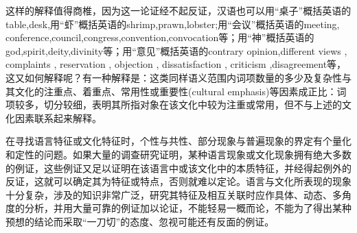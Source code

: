 这样的解释值得商椎，因为这一论证经不起反证，汉语也可以用“桌子”概括英语的table,desk,用“虾”概括英语的shrimp,prawn,lobster;用“会议”概括英语的meeting,
conference,council,congress,convention,convocation等；用“神”概括英语的god,spirit,deity,divinity等；用“意见”概括英语的contrary opinion,different views , complaints , reservation , objection , dissatisfaction , criticism ,disagreement等，这又如何解释呢？有一种解释是：这类同样语义范围内词项数量的多少及复杂性与其文化的注重点、着重点、常用性或重要性(cultural emphasis)等因素成正比：词项较多，切分较细，表明其所指对象在该文化中较为注重或常用，但不与上述的文化因素联系起来解释。

在寻找语言特征或文化特征时，个性与共性、部分现象与普遍现象的界定有个量化和定性的问题。如果大量的调查研究证明，某种语言现象或文化现象拥有绝大多数的例证，这些例证又足以证明在该语言中或该文化中的本质特征，并经得起例外的反证，这就可以确定其为特征或特点，否则就难以定论。语言与文化所表现的现象十分复杂，涉及的知识非常广泛，研究其特征及相互关联时应作具体、动态、多角度的分析，并用大量可靠的例证加以论证，不能轻易一概而论，不能为了得出某种预想的结论而采取“一刀切”的态度、忽视可能还有反面的例证。